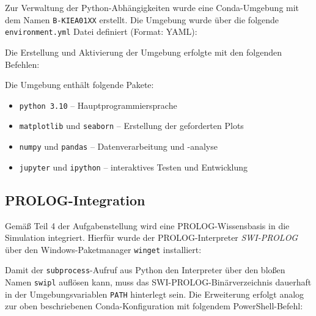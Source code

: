 Zur Verwaltung der Python-Abhängigkeiten wurde eine Conda-Umgebung mit dem Namen \texttt{B-KIEA01XX} erstellt. Die Umgebung wurde über die folgende \texttt{environment.yml} Datei definiert (Format: \acs{YAML}):



Die Erstellung und Aktivierung der Umgebung erfolgte mit den folgenden Befehlen:



Die Umgebung enthält folgende Pakete:

\begin{itemize}
    \item \texttt{python 3.10} – Hauptprogrammiersprache
    \item \texttt{matplotlib} und \texttt{seaborn} – Erstellung der geforderten Plots
    \item \texttt{numpy} und \texttt{pandas} – Datenverarbeitung und -analyse
    \item \texttt{jupyter} und \texttt{ipython} – interaktives Testen und Entwicklung
\end{itemize}

\subsection{\acs{PROLOG}-Integration}

Gemäß Teil 4 der Aufgabenstellung wird eine \acs{PROLOG}-Wissensbasis in die Simulation integriert. Hierfür wurde der \acs{PROLOG}-Interpreter \textit{\acs{SWI}-\acs{PROLOG}} über den Windows-Paketmanager \texttt{winget} installiert:



Damit der \texttt{subprocess}-Aufruf aus Python den Interpreter über den bloßen
Namen \texttt{swipl} auflösen kann, muss das \acs{SWI}-\acs{PROLOG}-Binärverzeichnis dauerhaft
in der Umgebungsvariablen \texttt{PATH} hinterlegt sein. Die Erweiterung erfolgt
analog zur oben beschriebenen Conda-Konfiguration mit folgendem PowerShell-Befehl:



